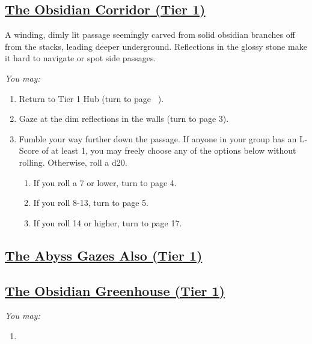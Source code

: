 \documentclass[sheet]{GL2020}
\begin{document}
\clearpage

\begin{center}\section*{\underline{The Obsidian Corridor (Tier 1)}}\end{center}
\label{ObsidianCorridor}

A winding, dimly lit passage seemingly carved from solid obsidian branches off from the stacks, leading deeper underground. Reflections in the glossy stone make it hard to navigate or spot side passages. 

\begingroup
\itshape
You may:
\begin{enumerate}[A]
	\item Return to Tier 1 Hub (turn to page ~\pageref{TierTwoHub}).
	\item Gaze at the dim reflections in the walls (turn to page 3).
	\item Fumble your way further down the passage. If anyone in your group has an L-Score of at least 1, you may freely choose any of the options below without rolling. Otherwise, roll a d20.
	\begin{enumerate}
		\item If you roll a 7 or lower, turn to page 4.
		\item If you roll 8-13, turn to page 5.
		\item If you roll 14 or higher, turn to page 17.
	\end{enumerate}
\end{enumerate}
\endgroup

\clearpage

\begin{center}\section*{\underline{The Abyss Gazes Also (Tier 1)}}\end{center}
\label{AbyssGazesAlso}

\clearpage

\begin{center}\section*{\underline{The Obsidian Greenhouse (Tier 1)}}\end{center}
\label{ObsidianGreenhouse}

\begingroup
\itshape
You may:
\begin{enumerate}[A]
  \item 
\end{enumerate}
\endgroup
\end{document}
